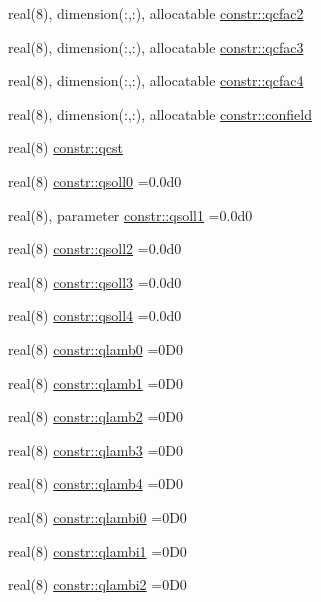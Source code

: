 \begin{DoxyCompactItemize}
real(8), dimension(\+:,\+:), allocatable \hyperlink{namespaceconstr_a782673708e19234113cb3f084461832b}{constr\+::qcfac2}
\item 
real(8), dimension(\+:,\+:), allocatable \hyperlink{namespaceconstr_a7b3aac306329483616d504a65054b8fb}{constr\+::qcfac3}
\item 
real(8), dimension(\+:,\+:), allocatable \hyperlink{namespaceconstr_af93a2b72075cfd5f649183e392e4f496}{constr\+::qcfac4}
\item 
real(8), dimension(\+:,\+:), allocatable \hyperlink{namespaceconstr_a862fa5ac4551dc4c5c5bdd92e86b533c}{constr\+::confield}
\item 
real(8) \hyperlink{namespaceconstr_a88ea236140e2db61760449c622b6aefb}{constr\+::qcst}
\item 
real(8) \hyperlink{namespaceconstr_abfbf6522e18eaf9397748a01e84e7894}{constr\+::qsoll0} =0.\+0d0
\item 
real(8), parameter \hyperlink{namespaceconstr_ab8723fa9ecb2a5b18496b199e586f3a8}{constr\+::qsoll1} =0.\+0d0
\item 
real(8) \hyperlink{namespaceconstr_a58b40724ec16e519451b798d3d7ab8b6}{constr\+::qsoll2} =0.\+0d0
\item 
real(8) \hyperlink{namespaceconstr_a9efb1bbf605739cd45eb23ba02e096e4}{constr\+::qsoll3} =0.\+0d0
\item 
real(8) \hyperlink{namespaceconstr_a7bc9e25c46df09075468fed7a86255f7}{constr\+::qsoll4} =0.\+0d0
\item 
real(8) \hyperlink{namespaceconstr_a71a650091cb17d25c0fa7c8a3a013cb5}{constr\+::qlamb0} =0\+D0
\item 
real(8) \hyperlink{namespaceconstr_a63e33f7b185213d983929801556d3724}{constr\+::qlamb1} =0\+D0
\item 
real(8) \hyperlink{namespaceconstr_a9ca0a1590d9f556ff216f87edce932aa}{constr\+::qlamb2} =0\+D0
\item 
real(8) \hyperlink{namespaceconstr_add50840d9e3f3339a914faf7021b4ed8}{constr\+::qlamb3} =0\+D0
\item 
real(8) \hyperlink{namespaceconstr_a75f9086ecf6dfa3e0112d61c7238d08e}{constr\+::qlamb4} =0\+D0
\item 
real(8) \hyperlink{namespaceconstr_a17954f7fbd341fdc4cca55cefe24fb51}{constr\+::qlambi0} =0\+D0
\item 
real(8) \hyperlink{namespaceconstr_a141f76999ff788fc33f775e86437ceb3}{constr\+::qlambi1} =0\+D0
\item 
real(8) \hyperlink{namespaceconstr_abdf9acb351b618a77f3c43b98a9b283e}{constr\+::qlambi2} =0\+D0

\end{DoxyCompactItemize}
